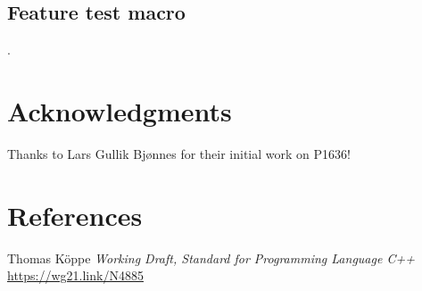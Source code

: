 \documentclass{wg21}
\begin{document}
\subsection{Feature test macro}

.

\section{Acknowledgments}

Thanks to Lars Gullik Bjønnes for their initial work on P1636!

\section{References}

\renewcommand{\section}[2]{}%



\begin{thebibliography}{9}


Thomas Köppe
\emph{Working Draft, Standard for Programming Language C++}\newline
\url{https://wg21.link/N4885}


\end{thebibliography}
\end{document}
